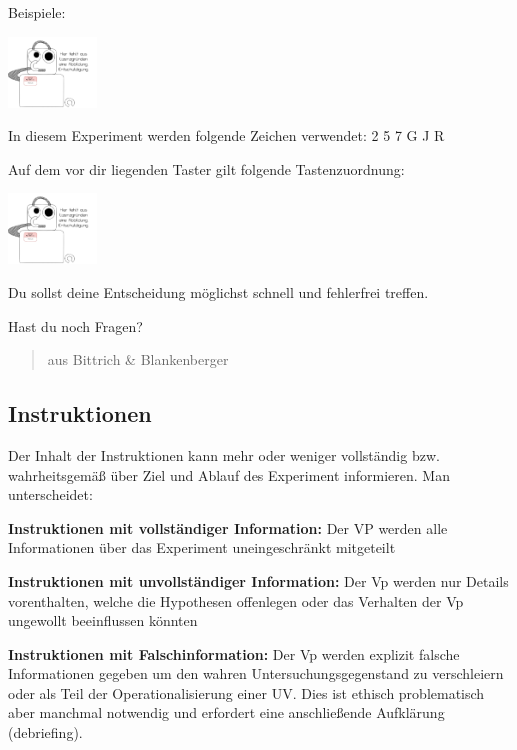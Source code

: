 \documentclass[
]{book}
\begin{document}
Beispiele:

\begin{center}\includegraphics[width=66.6666666666667pt]{imgs/copyright} \end{center}

In diesem Experiment werden folgende Zeichen verwendet: 2 5 7 G J R

Auf dem vor dir liegenden Taster gilt folgende Tastenzuordnung:

\begin{center}\includegraphics[width=66.6666666666667pt]{imgs/copyright} \end{center}

Du sollst deine Entscheidung möglichst schnell und fehlerfrei treffen.

Hast du noch Fragen?

\begin{quote}
aus Bittrich \& Blankenberger
\end{quote}

\hypertarget{instruktionen-1}{%
\subsection{Instruktionen}\label{instruktionen-1}}

Der Inhalt der Instruktionen kann mehr oder weniger vollständig bzw. wahrheitsgemäß über Ziel
und Ablauf des Experiment informieren. Man unterscheidet:

\textbf{Instruktionen mit vollständiger Information:}
Der VP werden alle Informationen über das
Experiment uneingeschränkt mitgeteilt

\textbf{Instruktionen mit unvollständiger Information:}
Der Vp werden nur Details vorenthalten,
welche die Hypothesen offenlegen oder das Verhalten der Vp ungewollt beeinflussen
könnten

\textbf{Instruktionen mit Falschinformation:}
Der Vp werden explizit falsche Informationen gegeben
um den wahren Untersuchungsgegenstand zu verschleiern oder als Teil der
Operationalisierung einer UV. Dies ist ethisch problematisch aber manchmal notwendig und
erfordert eine anschließende Aufklärung (debriefing).
\end{document}
